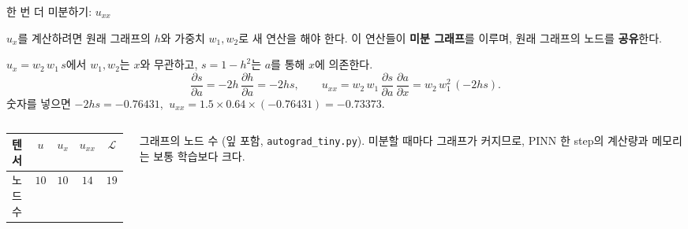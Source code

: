 \documentclass[aspectratio=169,11pt]{beamer}
\newcommand{\loss}{\mathcal{L}}
\newcommand{\pd}[2]{\frac{\partial #1}{\partial #2}}
\begin{document}
\begin{frame}{한 번 더 미분하기: $u_{xx}$}
\begin{keybox}
\small $u_x$를 계산하려면 원래 그래프의 $h$와 가중치 $w_1,w_2$로 새 연산을 해야 한다. 이 연산들이 \textbf{미분 그래프}를 이루며, 원래 그래프의 노드를 \textbf{공유}한다.
\end{keybox}
$u_x=w_2\,w_1\,s$에서 $w_1,w_2$는 $x$와 무관하고, $s=1-h^2$는 $a$를 통해 $x$에 의존한다.
\[
\pd{s}{a}=-2h\,\pd{h}{a}=-2hs,\qquad
u_{xx}=w_2\,w_1\,\pd{s}{a}\,\pd{a}{x}=w_2\,w_1^2\,(-2hs).
\]
숫자를 넣으면 $-2hs=-0.76431$, $\ u_{xx}=1.5\times0.64\times(-0.76431)=-0.73373$.

\vskip1mm
\begin{columns}[c,onlytextwidth]
\begin{column}{0.48\textwidth}
\small
\begin{tabular}{@{}lcccc@{}}
\toprule
텐서 & $u$ & $u_x$ & $u_{xx}$ & $\loss$ \\
\midrule
노드 수 & $10$ & $10$ & $14$ & $19$ \\
\bottomrule
\end{tabular}
\end{column}
\begin{column}{0.5\textwidth}
\small 그래프의 노드 수 (잎 포함, \texttt{autograd\_tiny.py}). 미분할 때마다 그래프가 커지므로, PINN 한 step의 계산량과 메모리는 보통 학습보다 크다.
\end{column}
\end{columns}
\end{frame}
\end{document}
